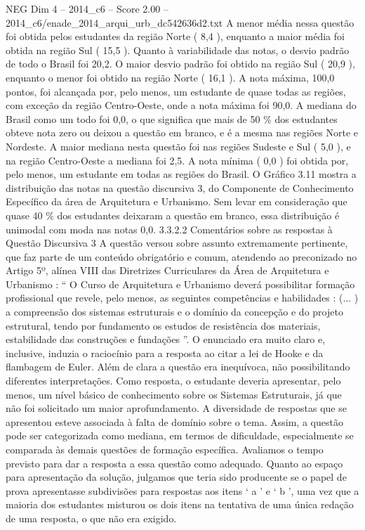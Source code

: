 \begin{textsample}{NEG Dim 4 – 2014\_c6 – Score 2.00 – 2014\_c6/enade\_2014\_arqui\_urb\_dc542636d2.txt}
A menor média nessa questão foi obtida pelos estudantes da região Norte ( 8,4 ), enquanto a maior média foi obtida na região Sul ( 15,5 ).
Quanto à variabilidade das notas, o desvio padrão de todo o Brasil foi 20,2.
O maior desvio padrão foi obtido na região Sul ( 20,9 ), enquanto o menor foi obtido na região Norte ( 16,1 ).
A nota máxima, 100,0 pontos, foi alcançada por, pelo menos, um estudante de quase todas as regiões, com exceção da região Centro-Oeste, onde a nota máxima foi 90,0.
A mediana do Brasil como um todo foi 0,0, o que significa que mais de 50 \% dos estudantes obteve nota zero ou deixou a questão em branco, e é a mesma nas regiões Norte e Nordeste.
A maior mediana nesta questão foi nas regiões Sudeste e Sul ( 5,0 ), e na região Centro-Oeste a mediana foi 2,5.
A nota mínima ( 0,0 ) foi obtida por, pelo menos, um estudante em todas as regiões do Brasil.
O Gráfico 3.11 mostra a distribuição das notas na questão discursiva 3, do Componente de Conhecimento Específico da área de Arquitetura e Urbanismo.
Sem levar em consideração que quase 40 \% dos estudantes deixaram a questão em branco, essa distribuição é unimodal com moda nas notas 0,0. 3.3.2.2 Comentários sobre as respostas à Questão Discursiva 3 A questão versou sobre assunto extremamente pertinente, que faz parte de um conteúdo obrigatório e comum, atendendo ao preconizado no Artigo 5º, alínea VIII das Diretrizes Curriculares da Área de Arquitetura e Urbanismo : “ O Curso de Arquitetura e Urbanismo deverá possibilitar formação profissional que revele, pelo menos, as seguintes competências e habilidades : (... ) a compreensão dos sistemas estruturais e o domínio da concepção e do projeto estrutural, tendo por fundamento os estudos de resistência dos materiais, estabilidade das construções e fundações ”.
O enunciado era muito claro e, inclusive, induzia o raciocínio para a resposta ao citar a lei de Hooke e da flambagem de Euler.
Além de clara a questão era inequívoca, não possibilitando diferentes interpretações.
Como resposta, o estudante deveria apresentar, pelo menos, um nível básico de conhecimento sobre os Sistemas Estruturais, já que não foi solicitado um maior aprofundamento.
A diversidade de respostas que se apresentou esteve associada à falta de domínio sobre o tema.
Assim, a questão pode ser categorizada como mediana, em termos de dificuldade, especialmente se comparada às demais questões de formação específica.
Avaliamos o tempo previsto para dar a resposta a essa questão como adequado.
Quanto ao espaço para apresentação da solução, julgamos que teria sido producente se o papel de prova apresentasse subdivisões para respostas aos itens ‘ a ’ e ‘ b ’, uma vez que a maioria dos estudantes misturou os dois itens na tentativa de uma única redação de uma resposta, o que não era exigido.

\end{textsample}
